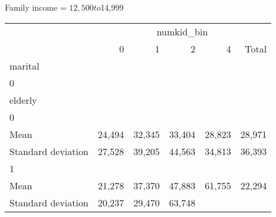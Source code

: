 Family income = $12,500 to $14,999
\begin{tabular}{llllll}
\cline{1-6}
\multicolumn{1}{c}{} &
  \multicolumn{5}{|c}{numkid\_bin} \\
\multicolumn{1}{c}{} &
  \multicolumn{1}{|r}{0} &
  \multicolumn{1}{r}{1} &
  \multicolumn{1}{r}{2} &
  \multicolumn{1}{r}{4} &
  \multicolumn{1}{r}{Total} \\
\cline{1-6}
\multicolumn{1}{l}{marital} &
  \multicolumn{1}{|r}{} &
  \multicolumn{1}{r}{} &
  \multicolumn{1}{r}{} &
  \multicolumn{1}{r}{} &
  \multicolumn{1}{r}{} \\
\multicolumn{1}{l}{\hspace{1em}0} &
  \multicolumn{1}{|r}{} &
  \multicolumn{1}{r}{} &
  \multicolumn{1}{r}{} &
  \multicolumn{1}{r}{} &
  \multicolumn{1}{r}{} \\
\multicolumn{1}{l}{\hspace{2em}elderly} &
  \multicolumn{1}{|r}{} &
  \multicolumn{1}{r}{} &
  \multicolumn{1}{r}{} &
  \multicolumn{1}{r}{} &
  \multicolumn{1}{r}{} \\
\multicolumn{1}{l}{\hspace{3em}0} &
  \multicolumn{1}{|r}{} &
  \multicolumn{1}{r}{} &
  \multicolumn{1}{r}{} &
  \multicolumn{1}{r}{} &
  \multicolumn{1}{r}{} \\
\multicolumn{1}{l}{\hspace{4em}Mean} &
  \multicolumn{1}{|r}{24,494} &
  \multicolumn{1}{r}{32,345} &
  \multicolumn{1}{r}{33,404} &
  \multicolumn{1}{r}{28,823} &
  \multicolumn{1}{r}{28,971} \\
\multicolumn{1}{l}{\hspace{4em}Standard deviation} &
  \multicolumn{1}{|r}{27,528} &
  \multicolumn{1}{r}{39,205} &
  \multicolumn{1}{r}{44,563} &
  \multicolumn{1}{r}{34,813} &
  \multicolumn{1}{r}{36,393} \\
\multicolumn{1}{l}{\hspace{3em}1} &
  \multicolumn{1}{|r}{} &
  \multicolumn{1}{r}{} &
  \multicolumn{1}{r}{} &
  \multicolumn{1}{r}{} &
  \multicolumn{1}{r}{} \\
\multicolumn{1}{l}{\hspace{4em}Mean} &
  \multicolumn{1}{|r}{21,278} &
  \multicolumn{1}{r}{37,370} &
  \multicolumn{1}{r}{47,883} &
  \multicolumn{1}{r}{61,755} &
  \multicolumn{1}{r}{22,294} \\
\multicolumn{1}{l}{\hspace{4em}Standard deviation} &
  \multicolumn{1}{|r}{20,237} &
  \multicolumn{1}{r}{29,470} &
  \multicolumn{1}{r}{63,748} &

\end{tabular}

